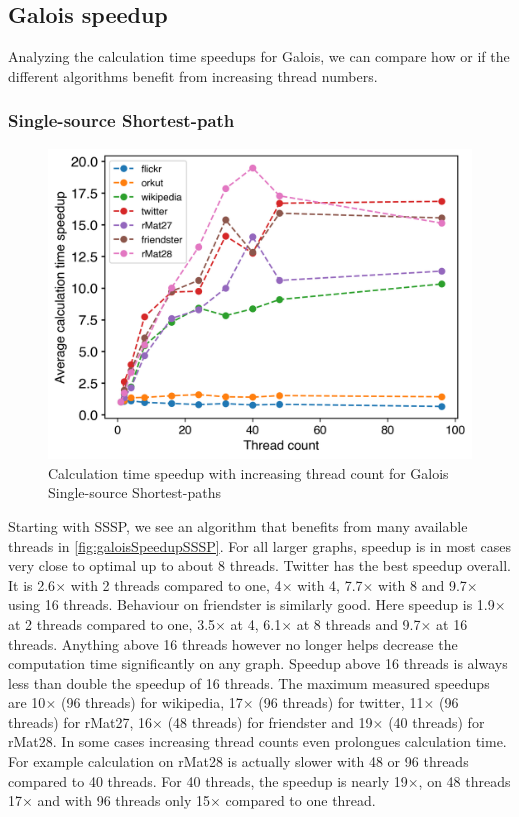 



\subsection{Galois speedup}
\label{sec:galois_speedup}
Analyzing the calculation time speedups for Galois, we can compare how or if the different algorithms benefit from increasing thread numbers.

\subsubsection{Single-source Shortest-path}
\begin{figure}
	\includegraphics[width=\linewidth]{../../plots/singleNodeSSSPGaloisThreads.png}
	\caption{Calculation time speedup with increasing thread count for Galois Single-source Shortest-paths}
	\label{fig:galoisSpeedupSSSP}
\end{figure}
Starting with SSSP, we see an algorithm that benefits from many available threads in \autoref{fig:galoisSpeedupSSSP}.
For all larger graphs, speedup is in most cases very close to optimal up to about 8 threads. 
Twitter has the best speedup overall. It is 2.6$\times$ with 2 threads compared to one, 4$\times$ with 4, 7.7$\times$ with 8 and 9.7$\times$ using 16 threads.
Behaviour on friendster is similarly good. Here speedup is 1.9$\times$ at 2 threads compared to one, 3.5$\times$ at 4, 6.1$\times$ at 8 threads and 9.7$\times$ at 16 threads.
Anything above 16 threads however no longer helps decrease the computation time significantly on any graph. Speedup above 16 threads is always less than double the speedup of 16 threads. The maximum measured speedups are 10$\times$ (96 threads) for wikipedia, 17$\times$ (96 threads) for twitter, 11$\times$ (96 threads) for rMat27, 16$\times$ (48 threads) for friendster and 19$\times$ (40 threads) for rMat28.
In some cases increasing thread counts even prolongues calculation time. For example calculation on rMat28 is actually slower with 48 or 96 threads compared to 40 threads. For 40 threads, the speedup is nearly 19$\times$, on 48 threads 17$\times$ and with 96 threads only 15$\times$ compared to one thread.

